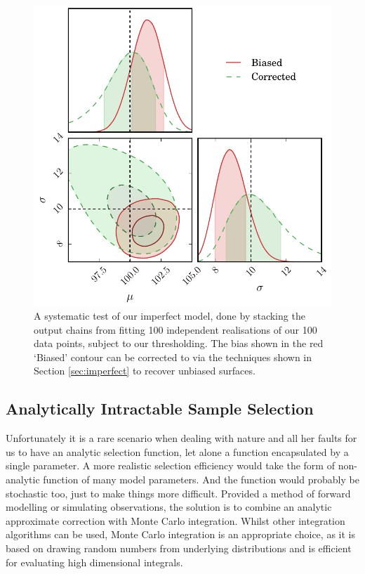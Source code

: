 \documentclass[a4paper,fleqn,usenatbib]{mnras}
\begin{document}
\begin{figure}
	\begin{center}
		\includegraphics[width=\columnwidth]{example/imperfect.pdf}
	\end{center}
	\caption{A systematic test of our imperfect model, done by stacking the output chains from fitting 100 independent realisations of our 100 data points, subject to our thresholding. The bias shown in the red `Biased' contour can be corrected to via the techniques shown in Section \ref{sec:imperfect} to recover unbiased surfaces.}
	\label{fig:imperfect}
\end{figure}












\subsection{Analytically Intractable Sample Selection}
\label{sec:real}
Unfortunately it is a rare scenario when dealing with nature and all her faults for us to have an analytic selection function, let alone a function encapsulated by a single parameter. A more realistic selection efficiency would take the form of non-analytic function of many model parameters. And the function would probably be stochastic too, just to make things more difficult. Provided a method of forward modelling or simulating observations, the solution is to combine an analytic approximate correction with Monte Carlo integration. Whilst other integration algorithms can be used, Monte Carlo integration is an appropriate choice, as it is based on drawing random numbers from underlying distributions and is efficient for evaluating high dimensional integrals.
\end{document}
